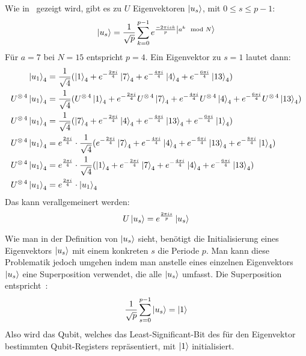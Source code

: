 Wie in~\autocite[227]{nielsen_chuang_2010} gezeigt wird, gibt es zu \(U\) Eigenvektoren \(\ket{u_s}\), 
mit \(0 \leq s \leq p-1\): 
\[\ket{u_s} =
\frac{1}{\sqrt{p}}
\sum_{k=0}^{p-1} e^{\frac{-2 \pi i s k}{p}\ket{a^k \mod N}} %
\]
Für \(a=7\) bei \(N=15\) entspricht \(p=4\).
Ein Eigenvektor zu \(s=1\) lautet dann:
\begin{align*}
    \ket{u_1}_4 &=
    \frac{1}{\sqrt{4}}(
        \ket{1}_4 + 
        e^{-\frac{2 \pi i}{4}}\ket{7}_4 + 
        e^{-\frac{4 \pi i}{4}}\ket{4}_4+ 
        e^{-\frac{6 \pi i}{4}}\ket{13}_4
    )\\   
    U^{\operatorname{\otimes} 4}\ket{u_1}_4 &=
    \frac{1}{\sqrt{4}}(
        U^{\operatorname{\otimes} 4}\ket{1}_4 + 
        e^{-\frac{2 \pi i}{4}}U^{\operatorname{\otimes} 4}\ket{7}_4 + 
        e^{-\frac{4 \pi i}{4}}U^{\operatorname{\otimes} 4}\ket{4}_4+ 
        e^{-\frac{6 \pi i}{4}}U^{\operatorname{\otimes} 4}\ket{13}_4
    )\\
    U^{\operatorname{\otimes} 4}\ket{u_1}_4 &=
    \frac{1}{\sqrt{4}}(
        \ket{7}_4 + 
        e^{-\frac{2 \pi i}{4}}\ket{4}_4 + 
        e^{-\frac{4 \pi i}{4}}\ket{13}_4+ 
        e^{-\frac{6 \pi i}{4}}\ket{1}_4
    )\\
    U^{\operatorname{\otimes} 4}\ket{u_1}_4 &=
    e^{\frac{2 \pi i}{4}}
    \cdot
    \frac{1}{\sqrt{4}}(
        e^{-\frac{2 \pi i}{4}}\ket{7}_4 + 
        e^{-\frac{4 \pi i}{4}}\ket{4}_4 + 
        e^{-\frac{6 \pi i}{4}}\ket{13}_4+ 
        e^{-\frac{8 \pi i}{4}}\ket{1}_4
    )\\
    U^{\operatorname{\otimes} 4}\ket{u_1}_4 &=
    e^{\frac{2 \pi i}{4}}
    \cdot
    \frac{1}{\sqrt{4}}(
        \ket{1}_4 +
        e^{-\frac{2 \pi i}{4}}\ket{7}_4 + 
        e^{-\frac{4 \pi i}{4}}\ket{4}_4 + 
        e^{-\frac{6 \pi i}{4}}\ket{13}_4 )\\
    U^{\operatorname{\otimes} 4}\ket{u_1}_4&=
    e^{\frac{2 \pi i}{4}} \cdot
    \ket{u_1}_4
\end{align*}
Das kann verallgemeinert werden:
\[U\ket{u_s} = e^{\frac{2 \pi i s}{p}}\ket{u_s}\]

Wie man in der Definition von \(\ket{u_s}\) 
sieht, 
benötigt die Initialisierung eines Eigenvektors \(\ket{u_s}\) mit einem konkreten \(s\) die Periode \(p\).
Man kann diese Problematik jedoch umgehen indem man anstelle eines einzelnen Eigenvektors \(\ket{u_s}\)
eine Superposition verwendet, die alle \(\ket{u_s}\) umfasst.
Die Superposition entspricht~\autocite[227]{nielsen_chuang_2010}:
\[\frac{1}{\sqrt{p}} \sum_{s=0}^{p-1}\ket{u_s} = \ket{1}\] 
Also wird das Qubit, welches das Least-Significant-Bit des für den Eigenvektor bestimmten Qubit-Registers repräsentiert, 
mit \(\ket{1}\) initialisiert.

